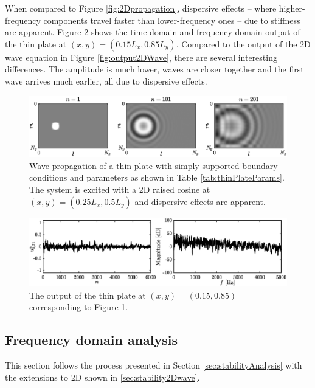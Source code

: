 {\renewcommand{\arraystretch}{1}

When compared to Figure \ref{fig:2Dpropagation}, dispersive effects -- where higher-frequency components travel faster than lower-frequency ones -- due to stiffness are apparent. Figure \ref{fig:outputThinPlate} shows the time domain and frequency domain output of the thin plate at $(x,y) = (0.15L_x, 0.85 L_y)$.
Compared to the output of the 2D wave equation in Figure \ref{fig:output2DWave}, there are several interesting differences. The amplitude is much lower, waves are closer together and the first wave arrives much earlier, all due to dispersive effects.
\begin{figure}[h]
    \centering
    \includegraphics[width = \textwidth]{figures/resonators/2d/thinPlatePropagation.eps}
    \caption{Wave propagation of a thin plate with simply supported boundary conditions and parameters as shown in Table \ref{tab:thinPlateParams}. The system is excited with a 2D raised cosine at $(x,y) = (0.25L_x, 0.5L_y)$ and dispersive effects are apparent.\label{fig:thinPlatePropagation}}
\end{figure}

\begin{figure}[h]
    \centering
    \includegraphics[width=\textwidth]{figures/resonators/2d/outputThinPlate.eps}
    \caption{The output of the thin plate at $(x,y) = (0.15, 0.85)$ corresponding to Figure \ref{fig:thinPlatePropagation}. \label{fig:outputThinPlate}}
\end{figure}

\subsection{Frequency domain analysis}\label{sec:stabilityThinPlate}
This section follows the process presented in Section \ref{sec:stabilityAnalysis} with the extensions to 2D shown in \ref{sec:stability2Dwave}.

}
